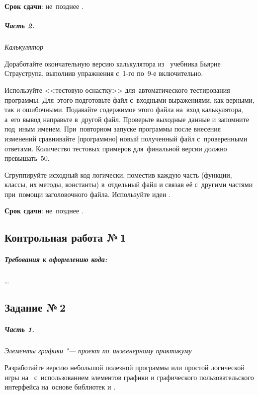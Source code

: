 \documentclass[a4paper,11pt,landscape,notitlepage,oneside,openany,final]{memoir}
\begin{document}
\medskip

\textbf{Срок сдачи}: не~позднее .



\subparagraph{Часть 2.}
\textit{Калькулятор}

Доработайте окончательную версию калькулятора из~ учебника Бьярне Страуструпа, выполнив упражнения с~1-го по~9-е включительно.

Используйте <<тестовую оснастку>> для~автоматического тестирования программы. Для~этого подготовьте файл с~входными выражениями, как верными, так и ошибочными. Подавайте содержимое этого файла на~вход калькулятора, а~его вывод направьте в~другой файл. Проверьте выходные данные и запомните под~иным именем. При~повторном запуске программы после внесения изменений сравнивайте [программно] новый полученный файл с~проверенными ответами. Количество тестовых примеров для~финальной версии должно превышать~50.

Сгруппируйте исходный код логически, поместив каждую часть (функции, классы, их методы, константы) в~отдельный файл и связав её с~другими частями при~помощи заголовочного файла. Используйте идеи .

\medskip

\textbf{Срок сдачи}: не~позднее .



\subsection{Контрольная работа №\,1}
\subparagraph{Требования к оформлению кода:}
\ldots



\subsection{Задание №\,2}
\subparagraph{Часть 1.}
\textit{Элементы графики "--- проект по~инженерному практикуму}

Разработайте версию небольшой полезной программы или простой логической игры на~ с~использованием элементов графики и графического пользовательского интерфейса на~основе библиотек  и .
\end{document}
